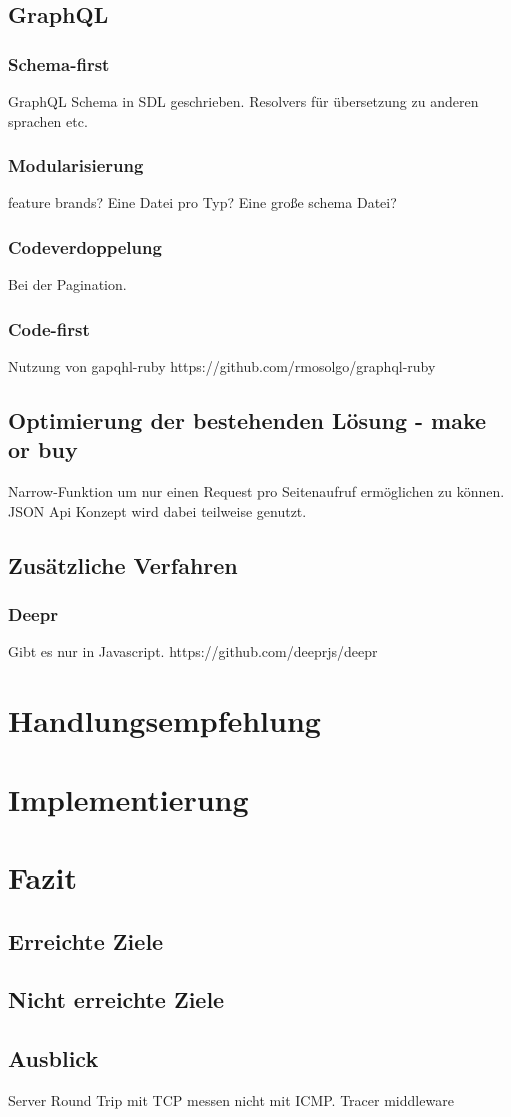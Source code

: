 \section{GraphQL}
\subsection{Schema-first}
GraphQL Schema in SDL geschrieben. Resolvers für übersetzung zu anderen sprachen etc.
\subsection{Modularisierung}
feature brands?
Eine Datei pro Typ?
Eine große schema Datei?
\subsection{Codeverdoppelung}
Bei der Pagination.
\subsection{Code-first}
Nutzung von gapqhl-ruby
https://github.com/rmosolgo/graphql-ruby
\section{Optimierung der bestehenden Lösung - make or buy}
Narrow-Funktion um nur einen Request pro Seitenaufruf ermöglichen zu können. JSON Api Konzept wird dabei teilweise genutzt.
\section{Zusätzliche Verfahren}
\subsection{Deepr}
Gibt es nur in Javascript.
https://github.com/deeprjs/deepr
\chapter{Handlungsempfehlung}

\chapter{Implementierung}

\chapter{Fazit}
\section{Erreichte Ziele}
\section{Nicht erreichte Ziele}
\section{Ausblick}
Server Round Trip mit TCP messen nicht mit ICMP. Tracer middleware
